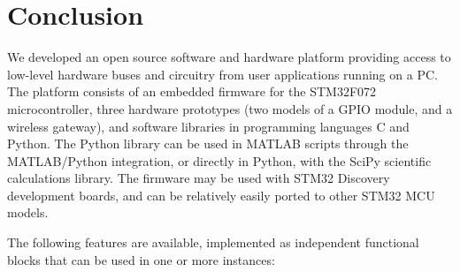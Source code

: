 \chapter{Conclusion}

We developed an open source software and hardware platform providing access to low-level hardware buses and circuitry from user applications running on a \gls{PC}. The platform consists of an embedded firmware for the STM32F072 microcontroller, three hardware prototypes (two models of a \gls{GPIO} module, and a wireless gateway), and software libraries in programming languages C and Python. The Python library can be used in MATLAB scripts through the MATLAB/Python integration, or directly in Python, with the SciPy scientific calculations library. The firmware may be used with STM32 Discovery development boards, and can be relatively easily ported to other STM32 \gls{MCU} models.

\noindent
The following features are available, implemented as independent functional blocks that can be used in one or more instances: 

